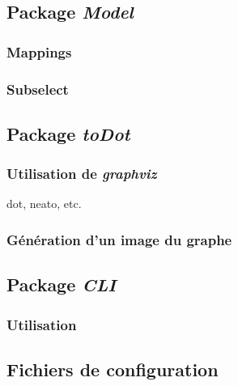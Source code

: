 \subsection{Package \emph{Model}}
\subsubsection{Mappings}
\subsubsection{Subselect}
\subsection{Package \emph{toDot}}
\subsubsection{Utilisation de \emph{graphviz}}
dot, neato, etc.
\subsubsection{Génération d'un image du graphe}
\subsection{Package \emph{CLI}}
\subsubsection{Utilisation}
\subsection{Fichiers de configuration}